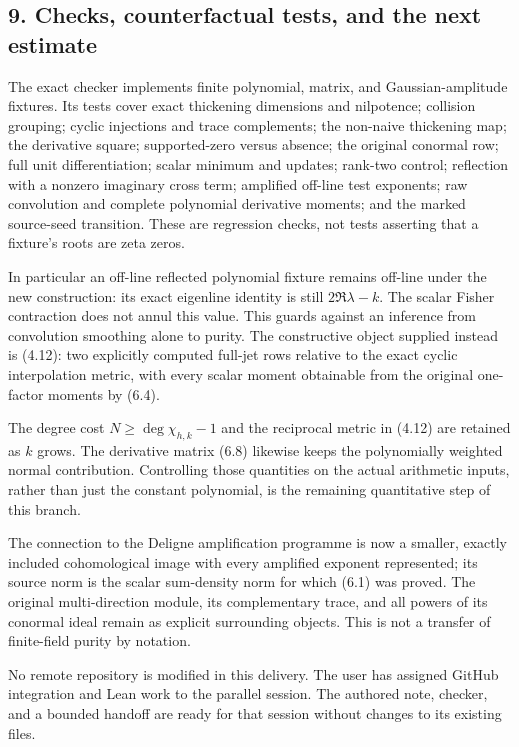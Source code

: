 \documentclass[
]{article}
\begin{document}
\subsection{9. Checks, counterfactual tests, and the next
estimate}\label{checks-counterfactual-tests-and-the-next-estimate}

The exact checker implements finite polynomial, matrix, and
Gaussian-amplitude fixtures. Its tests cover exact thickening dimensions
and nilpotence; collision grouping; cyclic injections and trace
complements; the non-naive thickening map; the derivative square;
supported-zero versus absence; the original conormal row; full unit
differentiation; scalar minimum and updates; rank-two control;
reflection with a nonzero imaginary cross term; amplified off-line test
exponents; raw convolution and complete polynomial derivative moments;
and the marked source-seed transition. These are regression checks, not
tests asserting that a fixture's roots are zeta zeros.

In particular an off-line reflected polynomial fixture remains off-line
under the new construction: its exact eigenline identity is still
\(2\Re\lambda-k\). The scalar Fisher contraction does not annul this
value. This guards against an inference from convolution smoothing alone
to purity. The constructive object supplied instead is (4.12): two
explicitly computed full-jet rows relative to the exact cyclic
interpolation metric, with every scalar moment obtainable from the
original one-factor moments by (6.4).

The degree cost \(N\ge\deg\chi_{h,k}-1\) and the reciprocal metric in
(4.12) are retained as \(k\) grows. The derivative matrix (6.8) likewise
keeps the polynomially weighted normal contribution. Controlling those
quantities on the actual arithmetic inputs, rather than just the
constant polynomial, is the remaining quantitative step of this branch.

The connection to the Deligne amplification programme is now a smaller,
exactly included cohomological image with every amplified exponent
represented; its source norm is the scalar sum-density norm for which
(6.1) was proved. The original multi-direction module, its complementary
trace, and all powers of its conormal ideal remain as explicit
surrounding objects. This is not a transfer of finite-field purity by
notation.

No remote repository is modified in this delivery. The user has assigned
GitHub integration and Lean work to the parallel session. The authored
note, checker, and a bounded handoff are ready for that session without
changes to its existing files.
\end{document}
